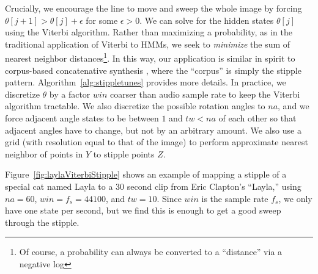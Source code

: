 \documentclass[runningheads]{llncs}
\begin{document}
Crucially, we encourage the line to move and sweep the whole image by forcing $\theta[j+1] > \theta[j] + \epsilon$ for some $\epsilon > 0$.  We can solve for the hidden states $\theta[j]$ using the Viterbi algorithm.  Rather than maximizing a probability, as in the traditional application of Viterbi to HMMs, we seek to {\em minimize} the sum of nearest neighbor distances\footnote{Of course, a probability can always be converted to a ``distance'' via a negative log}.  In this way, our application is similar in spirit to corpus-based concatenative synthesis \cite{schwarz2007corpus}, where the ``corpus'' is simply the stipple pattern.  Algorithm~\ref{alg:stippletunes} provides more details. In practice, we discretize $\theta$ by a factor $win$ coarser than audio sample rate to keep the Viterbi algorithm tractable.  We also discretize the possible rotation angles to $na$, and we force adjacent angle states to be between $1$ and $tw < na$ of each other so that adjacent angles have to change, but not by an arbitrary amount.  We also use a grid (with resolution equal to that of the image) to perform approximate nearest neighbor of points in $Y$ to stipple points $Z$.


Figure~\ref{fig:laylaViterbiStipple} shows an example of mapping a stipple of a special cat named Layla to a 30 second clip from Eric Clapton's ``Layla,'' using $na=60$, $win=f_s=44100$, and $tw=10$.  Since $win$ is the sample rate $f_s$, we only have one state per second, but we find this is enough to get a good sweep through the stipple.
\end{document}
